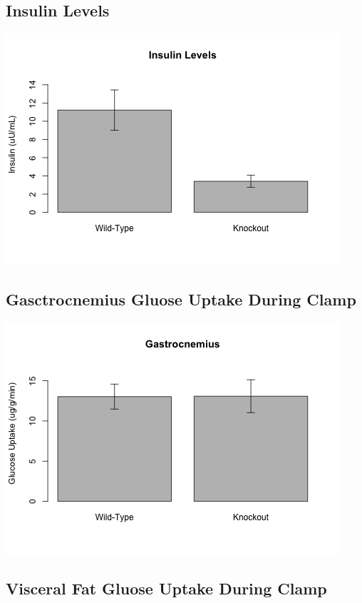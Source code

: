 \documentclass[]{article}
\begin{document}
\subsection{Insulin Levels}\label{insulin-levels}

\includegraphics{figures/insulin-1.png}

\subsection{Gasctrocnemius Gluose Uptake During
Clamp}\label{gasctrocnemius-gluose-uptake-during-clamp}

\includegraphics{figures/gastroc-1.png}

\subsection{Visceral Fat Gluose Uptake During
Clamp}\label{visceral-fat-gluose-uptake-during-clamp}
\end{document}
